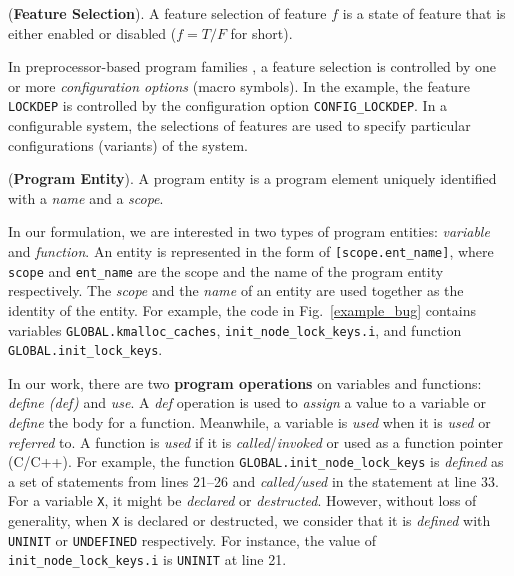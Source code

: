 \begin{Definition}{({\bf Feature Selection}).}
A feature selection of feature $f$ is a state of feature that is 
either enabled or disabled ($f=T/F$ for short).
\end{Definition}
%
In preprocessor-based program families \cite{kastner2012virtual}, a 
feature selection is controlled by one or more \textit{configuration 
options} (macro symbols). In the example, the feature \texttt{LOCKDEP} 
is controlled by the configuration option \texttt{CONFIG\_LOCKDEP}.
%
In a configurable system, the selections of features are used to specify
particular configurations (variants) of the system.
%
\begin{Definition}{({\bf Program Entity}).}
A program entity is a program element uniquely identified with
a \textit{name} and a \textit{scope}.
\end{Definition}

In our formulation, we are interested in two types of program
entities: {\em variable} and {\em function}.
%
An entity is represented in the form of \texttt{[scope.ent\_name]},
where \texttt{scope} and \texttt{ent\_name} are the scope and the 
name of the program entity respectively. The \textit{scope} and the
\textit{name} of an entity are used together as the identity of the
entity. For example, the code in Fig.~\ref{example_bug} contains
variables \texttt{GLOBAL.kmalloc\_caches}, \texttt{init\_node\_lock\_keys.i}, 
and function \texttt{GLOBAL.init\_lock\_keys}.
%

In our work, there are two {\bf program operations} on variables and
functions: \textit{define (def)} and \textit{use}. A \textit{def}
operation is used to \textit{assign} a value to a variable or
\textit{define} the body for a function. Meanwhile, a variable is
\textit{used} when it is \textit{used} or \textit{referred} to. A
function is \textit{used} if it is \textit{called}/\textit{invoked} or
used as a function pointer (C/C++). For example, the function
\texttt{GLOBAL.init\_node\_lock\_keys} is \textit{defined} as a set of
statements from lines 21--26 and \textit{called/used} in the statement
at line 33. For a variable \texttt{X}, it might be \textit{declared}
or \textit{destructed}. However, without loss of generality, when
\texttt{X} is declared or destructed, we consider that it is
\textit{defined} with \texttt{UNINIT} or \texttt{UNDEFINED}
respectively. For instance, the value of
\texttt{init\_node\_lock\_keys.i} is \texttt{UNINIT} at line 21.
%

